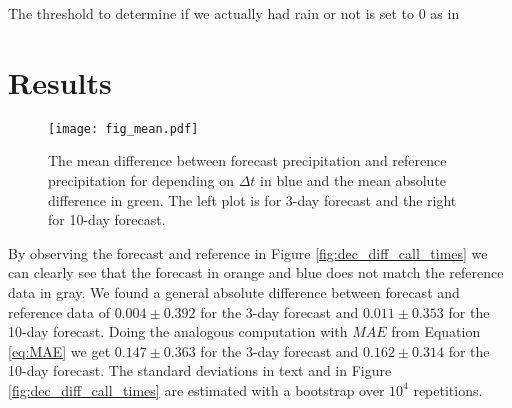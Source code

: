 \documentclass{article}
\theoremstyle{plain}
\theoremstyle{definition}
\theoremstyle{remark}
\begin{document}
The threshold to determine if we actually had rain or not is set to $0$ as in
\cite{Forecast_quaility_DWD}  %




\section{Results}\label{sec:results}
\begin{figure}
    \centering
    \texttt{[image: fig\_mean.pdf]}
    \caption{The mean difference between forecast precipitation and reference
    precipitation for depending on $\Delta t$ in blue and the mean absolute difference in green.
    The left plot is for 3-day forecast and the right for 10-day forecast.}
    \label{fig:mean_trend}
\end{figure}
By observing the forecast and reference in Figure \ref{fig:dec_diff_call_times}
we can clearly see that the forecast in orange and blue does not match the
reference data in gray. We found a general absolute difference between forecast
and reference data of $0.004 \pm 0.392$ for the 3-day forecast and $0.011 \pm
    0.353$ for the 10-day forecast. Doing the analogous computation with $MAE$ from
Equation \ref{eq:MAE} we get $0.147 \pm 0.363$ for the 3-day forecast and
$0.162 \pm 0.314$ for the 10-day forecast. The standard deviations in text and
in Figure \ref{fig:dec_diff_call_times} are estimated with a bootstrap over
$10^4$ repetitions. \\
\end{document}
